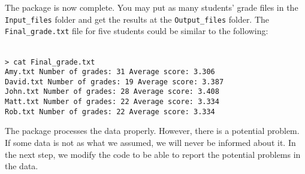 \noindent
The package is now complete. You may put as many students' grade files in the \texttt{Input\_files} folder and get the results at the \texttt{Output\_files} folder. The \texttt{Final\_grade.txt} file for five students could be similar to the following:

\begin{mdframed}[hidealllines=true,backgroundcolor=gray!20]
\begin{singlespace}
\fontsize{10pt}{1pt}
\texttt{
\\
> cat Final\_grade.txt \\
Amy.txt \phantom{x}\hspace{3ex}     Number of grades:  31  Average score:  3.306 \\
David.txt \phantom{x}\hspace{1ex}   Number of grades:  19  Average score:  3.387 \\
John.txt \phantom{x}\hspace{2ex}    Number of grades:  28  Average score:  3.408 \\
Matt.txt \phantom{x}\hspace{2ex}    Number of grades:  22  Average score:  3.334 \\
Rob.txt  \phantom{x}\hspace{3ex}     Number of grades:  22  Average score:  3.334 \\
 }
\end{singlespace}
\end{mdframed}
\noindent
The package processes the data properly. However, there is a potential problem. If some data is not as what we assumed, we will never be informed about it. In the next step, we modify the code to be able to report the potential problems in the data.\\


